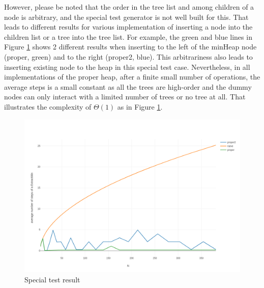 \documentclass{article}
\begin{document}
However, please be noted that the order in the tree list and among children of a node is arbitrary, and the special test generator is not well built for this. That leads to different results for various implementation of inserting a node into the children list or a tree into the tree list. For example, the green and blue lines in Figure \ref{fig:plot2} shows 2 different results when inserting to the left of the minHeap node (proper, green) and to the right (proper2, blue). This arbitrariness also leads to inserting existing node to the heap in this special test case. Nevertheless, in all implementations of the proper heap, after a finite small number of operations, the average steps is a small constant as all the trees are high-order and the dummy nodes can only interact with a limited number of trees or no tree at all. That illustrates the complexity of $\Theta(1)$ as in Figure \ref{fig:plot2}.


\begin{figure}[h!]
\centering
\includegraphics[width=\textwidth]{NTIN066-fibheap-plot2}
\caption{Special test result}
\label{fig:plot2}
\end{figure}
\end{document}
